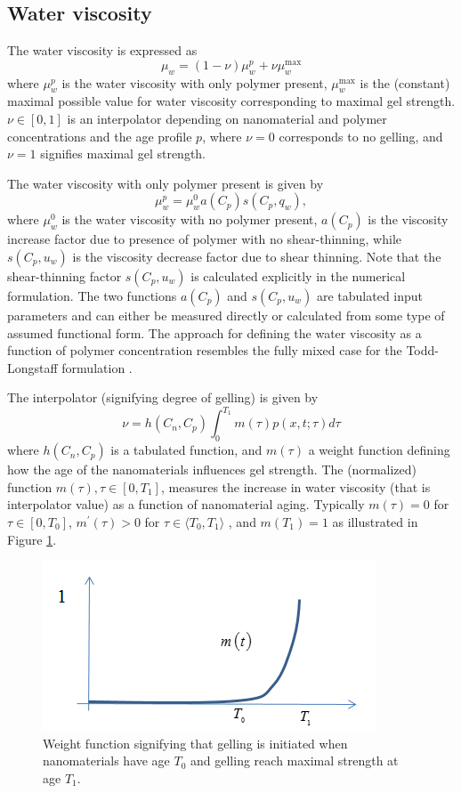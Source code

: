 \documentclass[energies,article,submit,moreauthors,pdftex]{Definitions/mdpi}
\begin{document}
\subsection{Water viscosity}
The water viscosity is expressed as
\begin{equation}
    \mu_w=(1-\nu)\mu^p_w + \nu\mu_w^{\max}
\end{equation}
where $\mu^p_w$ is the water viscosity with only polymer present, $\mu_w^{\max}$ is the (constant) maximal possible value for water viscosity corresponding to maximal gel strength. $\nu\in[0,1]$ is an interpolator depending on nanomaterial and polymer concentrations and the age profile $p$, where  $\nu=0$ corresponds to no gelling, and $\nu=1$  signifies maximal gel strength.

The water viscosity with only polymer present is given by
\begin{equation}
    \mu_w^p=\mu_w^0 a(C_p) s(C_p, q_w),
\end{equation}
where $\mu_w^0$ is the water viscosity with no polymer present, $a (C_p)$ is the viscosity increase factor due to presence of polymer with no shear-thinning, while $s(C_p, u_w)$ is the viscosity decrease factor due to shear thinning. Note that the shear-thinning factor $s(C_p, u_w)$ is calculated explicitly in the numerical formulation. The two functions $a (C_p)$ and $s(C_p, u_w)$ are tabulated input parameters and can either be measured directly or calculated from some type of assumed functional form. The approach for defining the water viscosity as a function of polymer concentration resembles the fully mixed case for the Todd-Longstaff formulation \citep{Todd1972}.   

The interpolator (signifying degree of gelling) is given by
\begin{equation} \label{eq:ageEffect} %
    \nu=h(C_n,C_p) \int^{T_1}_{0}m(\tau)p(x,t;\tau)d\tau
\end{equation}
where $h(C_n,C_p)$ is a tabulated function, and $m(\tau)$ a weight function defining how the age of the nanomaterials influences gel strength. The (normalized) function $m(\tau), \tau\in[0,T_1]$, measures the increase in water viscosity (that is interpolator value) as a function of nanomaterial aging. Typically $m(\tau)=0$ for $\tau\in[0,T_0]$,  $m^\prime(\tau)>0$ for $\tau\in\langle T_0, T_1\rangle$ , and $m(T_1)=1$ as illustrated in Figure \ref{fig:weightFunc}.

\begin{figure}[h]
    \centering
    \includegraphics[width=.5\textwidth]{fig/weightFunc.png}
    \caption{Weight function signifying that gelling is initiated when nanomaterials have age $T_0$ and gelling reach maximal strength at age $T_1$.}
    \label{fig:weightFunc}
\end{figure}
\end{document}
